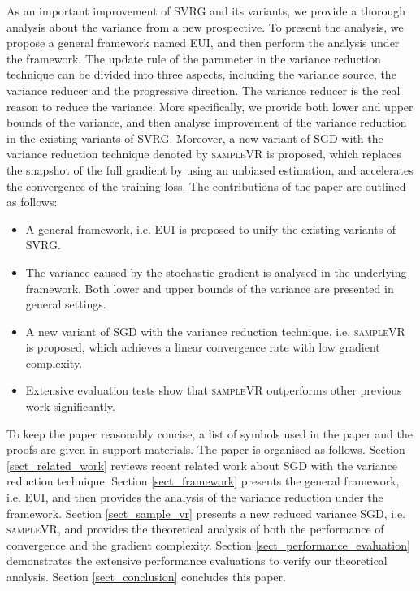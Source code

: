 \documentclass[letterpaper]{article}
\begin{document}
As an important improvement of SVRG and its variants, we provide a thorough analysis about the variance from a new prospective. To present the analysis, we propose  a general framework named EUI, and then perform the analysis under the framework. The  update rule of the parameter in the variance reduction technique can be divided into three aspects, including the variance source, the variance reducer and the progressive direction. The variance reducer is the real reason to reduce the variance.  More specifically, we provide both lower and upper bounds of the variance, and then analyse improvement of the variance reduction in the existing variants of SVRG.   Moreover, a new variant of SGD with the variance reduction technique denoted by \textsc{sampleVR} is proposed, which replaces the snapshot of the full gradient by using an unbiased estimation, and accelerates the convergence of the training loss.  The contributions of the paper are outlined as follows:
\begin{itemize}
\item A general framework, i.e. EUI is proposed to unify the existing variants of SVRG. 
\item The variance caused by the stochastic gradient is analysed in the underlying framework. Both lower and upper bounds of the variance are presented in general settings.
\item A new variant of SGD with the variance reduction technique, i.e. \textsc{sampleVR} is proposed, which achieves a linear convergence rate with low gradient complexity.
\item Extensive evaluation tests show that \textsc{sampleVR} outperforms  other previous work significantly. 
\end{itemize}

To keep the paper reasonably concise, a list of symbols   used in the paper and the proofs are given in support materials. The paper is organised as follows. Section \ref{sect_related_work} reviews recent related work about SGD with the variance reduction technique. Section \ref{sect_framework}  presents the general framework, i.e. EUI, and then provides the analysis of the variance reduction under the framework. Section \ref{sect_sample_vr} presents a new reduced variance SGD, i.e. \textsc{sampleVR}, and provides the theoretical analysis of both the performance of convergence and the gradient complexity.   Section \ref{sect_performance_evaluation} demonstrates the extensive performance evaluations to verify our theoretical analysis. Section \ref{sect_conclusion} concludes this paper. 
\end{document}
